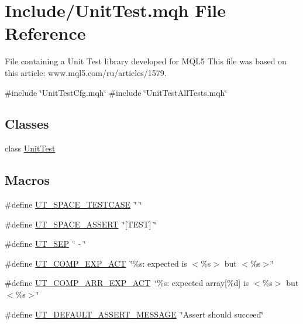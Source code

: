 \hypertarget{_unit_test_8mqh}{}\section{Include/\+Unit\+Test.mqh File Reference}
\label{_unit_test_8mqh}


File containing a Unit Test library developed for M\+Q\+L5 This file was based on this article\+: www.\+mql5.\+com/ru/articles/1579.  


{\ttfamily \#include \char`\"{}Unit\+Test\+Cfg.\+mqh\char`\"{}}\newline
{\ttfamily \#include \char`\"{}Unit\+Test\+All\+Tests.\+mqh\char`\"{}}\newline
\subsection*{Classes}
\begin{DoxyCompactItemize}
\item 
class \mbox{\hyperlink{class_unit_test}{Unit\+Test}}
\end{DoxyCompactItemize}
\subsection*{Macros}
\begin{DoxyCompactItemize}
\item 
\#define \mbox{\hyperlink{_unit_test_8mqh_abec0187655f13dec59b96cde105e5bc1}{U\+T\+\_\+\+S\+P\+A\+C\+E\+\_\+\+T\+E\+S\+T\+C\+A\+SE}}~\char`\"{}  \char`\"{}
\item 
\#define \mbox{\hyperlink{_unit_test_8mqh_a41d9aa881079f30c8488682ba6a90014}{U\+T\+\_\+\+S\+P\+A\+C\+E\+\_\+\+A\+S\+S\+E\+RT}}~\char`\"{}\mbox{[}T\+E\+ST\mbox{]} \char`\"{}
\item 
\#define \mbox{\hyperlink{_unit_test_8mqh_a4631b5eea3d8e74cd319ef46940fb539}{U\+T\+\_\+\+S\+EP}}~\char`\"{} -\/ \char`\"{}
\item 
\#define \mbox{\hyperlink{_unit_test_8mqh_a6369f0c6469a39ec1afa8834e8a96733}{U\+T\+\_\+\+C\+O\+M\+P\+\_\+\+E\+X\+P\+\_\+\+A\+CT}}~\char`\"{}\%s\+: expected is $<$\%s$>$ but $<$\%s$>$\char`\"{}
\item 
\#define \mbox{\hyperlink{_unit_test_8mqh_afdcc024902d14669b7a22158e646299b}{U\+T\+\_\+\+C\+O\+M\+P\+\_\+\+A\+R\+R\+\_\+\+E\+X\+P\+\_\+\+A\+CT}}~\char`\"{}\%s\+: expected array\mbox{[}\%d\mbox{]} is $<$\%s$>$ but $<$\%s$>$\char`\"{}
\item 
\#define \mbox{\hyperlink{_unit_test_8mqh_a96f5d62188d09039ebc3f443c9120e39}{U\+T\+\_\+\+D\+E\+F\+A\+U\+L\+T\+\_\+\+A\+S\+S\+E\+R\+T\+\_\+\+M\+E\+S\+S\+A\+GE}}~\char`\"{}Assert should succeed\char`\"{}
\end{DoxyCompactItemize}
